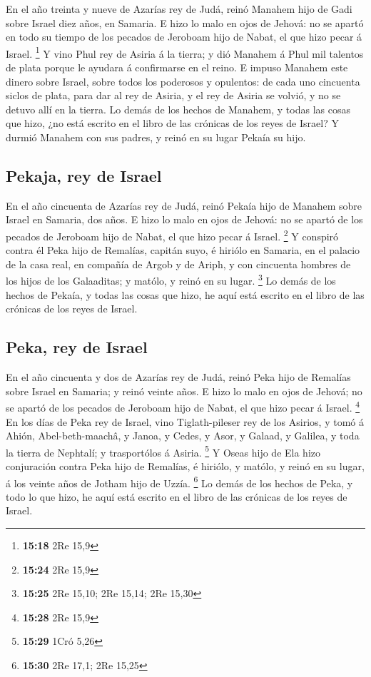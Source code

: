  En el año treinta y nueve de Azarías rey de Judá, reinó
Manahem hijo de Gadi sobre Israel diez años, en Samaria. 
E hizo lo malo en ojos de Jehová: no se apartó en todo su tiempo de los
pecados de Jeroboam hijo de Nabat, el que hizo pecar á Israel.
\footnote{\textbf{15:18} 2Re 15,9}  Y vino Phul rey de
Asiria á la tierra; y dió Manahem á Phul mil talentos de plata porque le
ayudara á confirmarse en el reino.  E impuso Manahem este
dinero sobre Israel, sobre todos los poderosos y opulentos: de cada uno
cincuenta siclos de plata, para dar al rey de Asiria, y el rey de Asiria
se volvió, y no se detuvo allí en la tierra.  Lo demás de
los hechos de Manahem, y todas las cosas que hizo, ¿no está escrito en
el libro de las crónicas de los reyes de Israel?  Y
durmió Manahem con sus padres, y reinó en su lugar Pekaía su hijo.

\hypertarget{pekaja-rey-de-israel}{%
\subsection{Pekaja, rey de Israel}\label{pekaja-rey-de-israel}}

 En el año cincuenta de Azarías rey de Judá, reinó Pekaía
hijo de Manahem sobre Israel en Samaria, dos años.  E
hizo lo malo en ojos de Jehová: no se apartó de los pecados de Jeroboam
hijo de Nabat, el que hizo pecar á Israel. \footnote{\textbf{15:24} 2Re
  15,9}  Y conspiró contra él Peka hijo de Remalías,
capitán suyo, é hiriólo en Samaria, en el palacio de la casa real, en
compañía de Argob y de Ariph, y con cincuenta hombres de los hijos de
los Galaaditas; y matólo, y reinó en su lugar. \footnote{\textbf{15:25}
  2Re 15,10; 2Re 15,14; 2Re 15,30}  Lo demás de los
hechos de Pekaía, y todas las cosas que hizo, he aquí está escrito en el
libro de las crónicas de los reyes de Israel.

\hypertarget{peka-rey-de-israel}{%
\subsection{Peka, rey de Israel}\label{peka-rey-de-israel}}

 En el año cincuenta y dos de Azarías rey de Judá, reinó
Peka hijo de Remalías sobre Israel en Samaria; y reinó veinte años.
 E hizo lo malo en ojos de Jehová; no se apartó de los
pecados de Jeroboam hijo de Nabat, el que hizo pecar á Israel.
\footnote{\textbf{15:28} 2Re 15,9}  En los días de Peka
rey de Israel, vino Tiglath-pileser rey de los Asirios, y tomó á Ahión,
Abel-beth-maachâ, y Janoa, y Cedes, y Asor, y Galaad, y Galilea, y toda
la tierra de Nephtalí; y trasportólos á Asiria. \footnote{\textbf{15:29}
  1Cró 5,26}  Y Oseas hijo de Ela hizo conjuración contra
Peka hijo de Remalías, é hiriólo, y matólo, y reinó en su lugar, á los
veinte años de Jotham hijo de Uzzía. \footnote{\textbf{15:30} 2Re 17,1;
  2Re 15,25}  Lo demás de los hechos de Peka, y todo lo
que hizo, he aquí está escrito en el libro de las crónicas de los reyes
de Israel.

